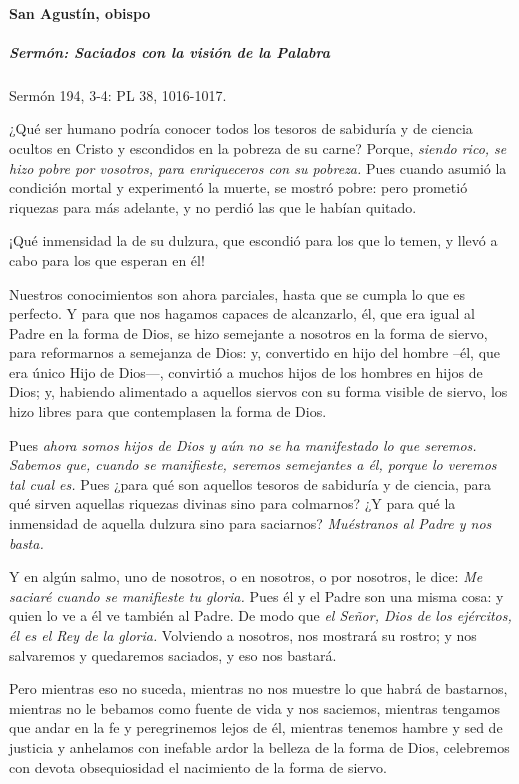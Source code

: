 \documentclass[]{article}
\let\oldparagraph\paragraph
\renewcommand{\paragraph}[1]{\oldparagraph{#1}\mbox{}}
\let\oldsubparagraph\subparagraph
\renewcommand{\subparagraph}[1]{\oldsubparagraph{#1}\mbox{}}
\begin{document}
\paragraph{San Agustín, obispo}\label{san-agustuxedn-obispo-1}

\subparagraph{Sermón: Saciados con la visión de la
Palabra}\label{sermuxf3n-saciados-con-la-visiuxf3n-de-la-palabra}

Sermón 194, 3-4: PL 38, 1016-1017.

¿Qué ser humano podría conocer todos los tesoros de sabiduría y de
ciencia ocultos en Cristo y escondidos en la pobreza de su carne?
Porque, \emph{siendo rico, se hizo pobre por vosotros, para enriqueceros
con su pobreza.} Pues cuando asumió la condición mortal y experimentó la
muerte, se mostró pobre: pero prometió riquezas para más adelante, y no
perdió las que le habían quitado.

¡Qué inmensidad la de su dulzura, que escondió para los que lo temen, y
llevó a cabo para los que esperan en él!

Nuestros conocimientos son ahora parciales, hasta que se cumpla lo que
es perfecto. Y para que nos hagamos capaces de alcanzarlo, él, que era
igual al Padre en la forma de Dios, se hizo semejante a nosotros en la
forma de siervo, para reformarnos a semejanza de Dios: y, convertido en
hijo del hombre --él, que era único Hijo de Dios---, convirtió a muchos
hijos de los hombres en hijos de Dios; y, habiendo alimentado a aquellos
siervos con su forma visible de siervo, los hizo libres para que
contemplasen la forma de Dios.

Pues \emph{ahora somos hijos de Dios y aún no se ha manifestado lo que
seremos. Sabemos que, cuando se manifieste, seremos semejantes a él,
porque lo veremos tal cual es.} Pues ¿para qué son aquellos tesoros de
sabiduría y de ciencia, para qué sirven aquellas riquezas divinas sino
para colmarnos? ¿Y para qué la inmensidad de aquella dulzura sino para
saciarnos? \emph{Muéstranos al Padre y nos basta.}

Y en algún salmo, uno de nosotros, o en nosotros, o por nosotros, le
dice: \emph{Me saciaré cuando se manifieste tu gloria.} Pues él y el
Padre son una misma cosa: y quien lo ve a él ve también al Padre. De
modo que \emph{el Señor, Dios de los ejércitos, él es el Rey de la
gloria.} Volviendo a nosotros, nos mostrará su rostro; y nos salvaremos
y quedaremos saciados, y eso nos bastará.

Pero mientras eso no suceda, mientras no nos muestre lo que habrá de
bastarnos, mientras no le bebamos como fuente de vida y nos saciemos,
mientras tengamos que andar en la fe y peregrinemos lejos de él,
mientras tenemos hambre y sed de justicia y anhelamos con inefable ardor
la belleza de la forma de Dios, celebremos con devota obsequiosidad el
nacimiento de la forma de siervo.
\end{document}
